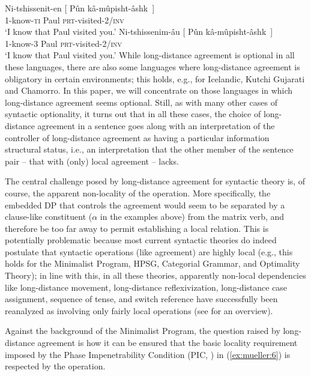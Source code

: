 \documentclass[output=paper
,modfonts
,nonflat]{langsci/langscibook}
\begin{document}
	\ea\label{ex:mueller:5}
	\ea 
	\gll Ni-tshissenit-en [\sub{$\alpha$} P\^{u}n k\^{a}-m\^{u}pisht-\^{a}shk~] \\
	1-know-{{\scshape ti}} {} Paul {\scshape prt}-visited-2/{\scshape inv} \\
	\glt `I know that Paul visited you.'
	\ex
	\gll Ni-tshissenim-{\^a}u [\sub{$\alpha$} P\^{u}n k\^{a}-m\^{u}pisht-\^{a}shk~] \\
	1-know-{3} {} {Paul} {\scshape prt}-visited-2/{\scshape inv} \\
	\glt `I know that Paul visited you.'
	\z
	\z
	While long-distance agreement is optional in all these languages,
	there are also some languages where long-distance agreement is
	obligatory in certain environments; this holds, e.g., for Icelandic,
	Kutchi Gujarati and Chamorro.  In this paper, we will concentrate on
	those languages in which long-distance agreement seems
	optional. Still, as with many other cases of syntactic optionality, it
	turns out that in all these cases, the choice of long-distance
	agreement in a sentence goes along with an interpretation of the
	controller of long-distance agreement as having a particular
	information structural status, i.e., an interpretation that the other
	member of the sentence pair -- that with (only) local agreement --
	lacks. 
	
	The central challenge posed by long-distance agreement for syntactic
	theory is, of course, the apparent non-locality of the operation. More
	specifically, the embedded DP that controls the agreement would seem
	to be separated by a clause-like constituent ($\alpha$ in the examples
	above) from the matrix verb, and therefore be too far away to permit
	establishing a local relation.  This is potentially problematic
	because most current syntactic theories do indeed postulate that
	syntactic operations (like agreement) are highly local (e.g., this
	holds for the Minimalist Program, HPSG, Categorial Grammar, and Optimality
	Theory); in line with this, in all these theories, apparently
	non-local dependencies like long-distance movement, long-distance
	reflexivization, long-distance case assignment, sequence of tense, and
	switch reference have successfully been reanalyzed as involving only
	fairly local operations (see \citealt{Alexiadouetal:12} for an
	overview).
	
	Against the background of the Minimalist Program, the question raised
	by long-distance agreement is how it can be ensured that the basic
	locality requirement imposed by the Phase Impenetrability Condition
	(PIC, \citealt{Chomsky:00,Chomsky:01,Chomsky:08,Chomsky:13}) in (\ref{ex:mueller:6}) is
	respected by the operation. 
	
\end{document}
